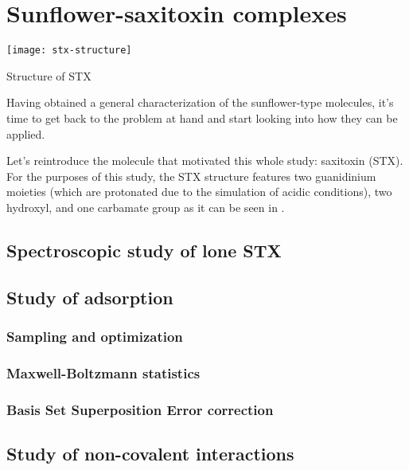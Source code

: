 \chapter{Sunflower-saxitoxin complexes}

\begin{marginfigure}
    \texttt{[image: stx-structure]}
    \caption[Structure of STX]{Structure of STX}
\end{marginfigure}

Having obtained a general characterization of the sunflower-type molecules, it's time to get back to the problem at hand and start looking into how they can be applied.

Let's reintroduce the molecule that motivated this whole study: saxitoxin (STX).
For the purposes of this study, the STX structure features two guanidinium moieties (which are protonated due to the simulation of acidic conditions), two hydroxyl, and one carbamate group as it can be seen in .

\blindtext

\section{Spectroscopic study of lone STX}

\blindtext[3]

\section{Study of adsorption}
\blindtext
\subsection{Sampling and optimization}
\blindtext
\subsection{Maxwell-Boltzmann statistics}
\blindtext
\subsection{Basis Set Superposition Error correction}
\blindtext

\section{Study of non-covalent interactions}
\blindtext

